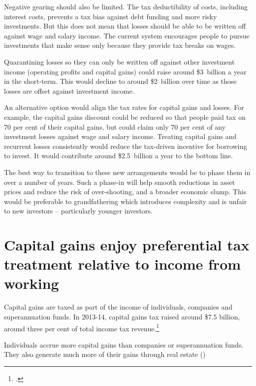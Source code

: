 \documentclass{grattan}\usepackage[]{graphicx}\usepackage[]{color}
\begin{document}
Negative gearing should also be limited. The tax deductibility of costs, including interest costs, prevents a tax bias against debt funding and more risky investments. But this does not mean that losses should be able to be written off against wage and salary income. The current system encourages people to pursue investments that make sense only because they provide tax breaks on wages.

Quarantining losses so they can only be written off against other investment income (operating profits and capital gains) could raise around \$3~billion a year in the short-term. This would decline to around \$2~billion over time as those losses are offset against investment income.  

An alternative option would align the tax rates for capital gains and losses.  For example, the capital gains discount could be reduced so that people paid tax on 70 per cent of their capital gains, but could claim only 70 per cent of any investment losses against wage and salary income. Treating capital gains and recurrent losses consistently would reduce the tax-driven incentive for borrowing to invest. It would contribute around \$2.5~billion a year to the bottom line.

The best way to transition to these new arrangements would be to phase them in over a number of years. Such a phase-in will help smooth reductions in asset prices and reduce the risk of over-shooting, and a broader economic slump. This would be preferable to grandfathering which introduces complexity and is unfair to new investors -- particularly younger investors.

\section{Capital gains enjoy preferential tax treatment relative to income from working}
Capital gains are taxed as part of the income of individuals, companies and superannuation funds. In 2013-14, capital gains tax raised around \$7.5 billion, around three per cent of total income tax revenue.\footcite{Treasury2014a} 

Individuals accrue more capital gains than companies or superannuation funds. They also generate much more of their gains through real estate ()
\end{document}
